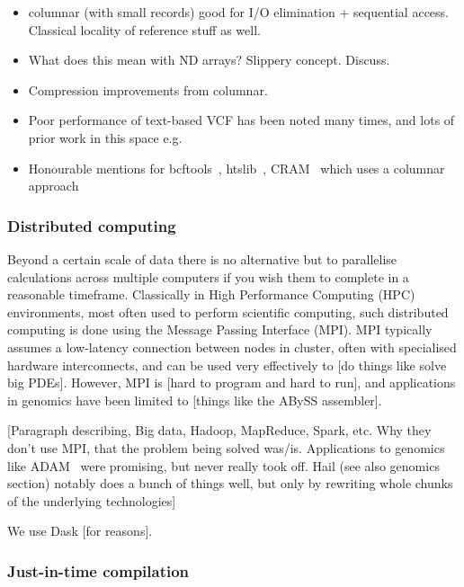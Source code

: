 \documentclass[a4paper,num-refs]{oup-contemporary}
\begin{document}
\begin{itemize}
\item columnar (with small records) good for I/O elimination + sequential access.
Classical locality of reference stuff as well.
\item What does this mean with ND arrays? Slippery concept. Discuss.
\item Compression improvements from columnar.
\item Poor performance of text-based VCF has been noted many times,
and lots of prior work in this space e.g. \citep{kelleher2013processing}
\item Honourable mentions for bcftools~\citep{danecek2021twelve},
htslib~\citep{bonfield2021htslib}, CRAM~\citep{bonfield2014scramble,bonfield2022cram}
which uses a columnar approach
\end{itemize}

\subsubsection{Distributed computing}

Beyond a certain scale of data there is no alternative but to
parallelise calculations across multiple computers if you wish
them to complete in a reasonable timeframe. Classically in
High Performance Computing (HPC) environments, most often used
to perform scientific computing, such distributed computing
is done using the Message Passing Interface (MPI). MPI
typically assumes a low-latency connection between nodes in
cluster, often with specialised hardware interconnects,
and can be used very effectively to [do things like solve big PDEs].
However, MPI is [hard to program and hard to run], and applications
in genomics have been limited to [things like the ABySS assembler].

[Paragraph describing, Big data, Hadoop, MapReduce, Spark, etc. Why
they don't use MPI, that the problem being solved was/is.
Applications to genomics like ADAM~\citep{nothaft2015rethinking} were promising, but never really
took off. Hail (see also genomics section) notably does a
bunch of things well, but only by rewriting whole chunks of the
underlying technologies]

We use Dask [for reasons].

\subsubsection{Just-in-time compilation}
\end{document}
